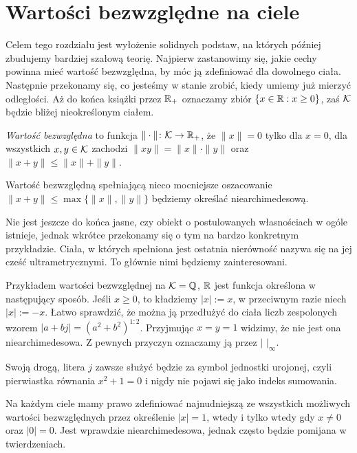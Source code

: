 \section{Wartości bezwzględne na ciele}
Celem  tego rozdziału jest wyłożenie solidnych podstaw, na których później zbudujemy bardziej szałową teorię.
Najpierw zastanowimy się, jakie cechy powinna mieć wartość bezwzględna, by móc ją zdefiniować dla dowolnego ciała.
Następnie przekonamy się, co jesteśmy w stanie zrobić, kiedy umiemy już mierzyć odległości.
Aż do końca książki przez $\mathbb R_+$ oznaczamy zbiór $\{x \in \mathbb R : x \ge 0\}$, zaś $\mathcal K$ będzie bliżej nieokreślonym ciałem.

\begin{definicja}
	\emph{Wartość bezwzględna}  to funkcja $\|\cdot\| \colon \mathcal K \to \mathbb R_+$, że $\|x\| = 0$ tylko dla $x = 0$, dla wszystkich $x, y \in \mathcal K $ zachodzi $\|xy\| = \|x\| \cdot \|y\|$ oraz $\|x + y\| \le \|x\| + \|y\|$.
	
	Wartość bezwzględną spełniającą nieco mocniejsze oszacowanie $\|x+y\| \le \max \{\|x\|, \|y\|\}$ będziemy określać niearchimedesową.
\end{definicja}

Nie jest jeszcze do końca jasne, czy obiekt o postulowanych własnościach w ogóle istnieje, jednak wkrótce przekonamy się o tym na bardzo konkretnym przykładzie.
Ciała, w których spełniona jest ostatnia nierówność nazywa się na jej cześć ultrametrycznymi.
To głównie nimi będziemy zainteresowani.

Przykładem wartości bezwzględnej na $\mathcal K = \mathbb Q$, $\mathbb R$ jest funkcja określona w następujący sposób.
Jeśli $x \ge 0$, to kładziemy $|x| := x$, w przeciwnym razie niech $|x| := -x$.
Łatwo sprawdzić, że można ją przedłużyć do ciała liczb zespolonych wzorem $|a + bj| = (a^2+b^2)^{1:2}$.
Przyjmując $x = y = 1$ widzimy, że nie jest ona niearchimedesowa.
Z pewnych przyczyn oznaczamy ją przez $|\,\,|_\infty$.

Swoją drogą, litera $j$ zawsze służyć będzie za symbol jednostki urojonej, czyli pierwiastka równania $x^2 + 1 = 0$ i nigdy nie pojawi się jako indeks sumowania.

Na każdym ciele mamy prawo zdefiniować najnudniejszą ze wszystkich możliwych wartości bezwzględnych przez określenie $|x| = 1$, wtedy i tylko wtedy gdy $x \neq 0$ oraz $|0| = 0$.
Jest wprawdzie niearchimedesowa, jednak często będzie pomijana w twierdzeniach.

